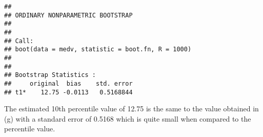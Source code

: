 \documentclass[]{article}
\begin{document}
\begin{verbatim}
## 
## ORDINARY NONPARAMETRIC BOOTSTRAP
## 
## 
## Call:
## boot(data = medv, statistic = boot.fn, R = 1000)
## 
## 
## Bootstrap Statistics :
##     original  bias    std. error
## t1*    12.75 -0.0113   0.5168844
\end{verbatim}

The estimated 10th percentile value of 12.75 is the same to the value
obtained in (g) with a standard error of 0.5168 which is quite small
when compared to the percentile value.
\end{document}
